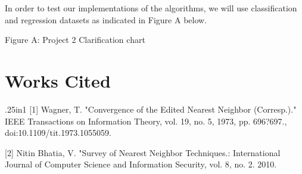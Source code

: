 \documentclass{article}
\begin{document}
\quad \quad In order to test our implementations of the algorithms, we will use classification and regression datasets as indicated in Figure A below. 

\begin{center}
    \caption{Figure A: Project 2 Clarification chart}
\end{center}


\section{Works Cited}
\begin{hangparas}{.25in}{1}
[1] Wagner, T. "Convergence of the Edited Nearest Neighbor (Corresp.)." IEEE Transactions on Information Theory, vol. 19, no. 5, 1973, pp. 696?697., doi:10.1109/tit.1973.1055059.

[2] Nitin Bhatia, V. "Survey of Nearest Neighbor Techniques.: International Journal of Computer Science and Information Security, vol. 8, no. 2. 2010.
\end{hangparas}
\end{document}
